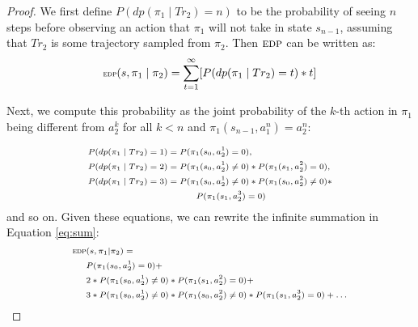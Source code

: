 \documentclass[letterpaper]{article}
\begin{document}
\begin{proof}
We first define $P(dp(\pi_1 \mid Tr_2)=n)$ to be the probability of seeing $n$ steps before observing an action that $\pi_1$ will not take in state $s_{n-1}$, assuming that $Tr_2$ is some trajectory sampled from $\pi_2$. Then $\textsc{edp}$ can be written as:%
\begin{equation}
\scriptsize
\label{eq:sum}
    \textsc{edp}(s, \pi_1 \mid \pi_2) = \sum\limits_{t=1}^\infty[P(dp(\pi_1 \mid Tr_2) = t)*t]
\normalsize
\end{equation}

Next, we compute this probability as the joint probability of the $k$-th action in $\pi_1$ being different from $a_2^k$ for all $k < n$ and $\pi_1(s_{n-1},a_1^n)=a_2^n$:

\begin{equation}
\label{eq:series}
\scriptsize
\begin{split}
    & P(dp(\pi_1 \mid Tr_2) = 1) = P(\pi_1(s_0, a_2^1) = 0), \\
    & P(dp(\pi_1 \mid Tr_2) = 2) = P(\pi_1(s_0, a_2^1) \neq 0)*P(\pi_1(s_1, a_2^2) = 0), \\
    & P(dp(\pi_1 \mid Tr_2) = 3) = P(\pi_1(s_0, a_2^1) \neq 0)*P(\pi_1(s_0, a_2^2) \neq 0) * \\ & \qquad \qquad \qquad \qquad \qquad ~~~~~~ P(\pi_1(s_1, a_2^3) = 0)
\end{split}
\normalsize
\end{equation}
and so on. Given these equations, we can rewrite the infinite summation in Equation \ref{eq:sum}:
\begin{equation*}
\scriptsize
\begin{split}
     \textsc{edp} & (s, \pi_1 | \pi_2) = \\
     & P(\pi_1(s_0, a_2^1) = 0) + \\
     & 2*P(\pi_1(s_0, a_2^1) \neq 0)*P(\pi_1(s_1, a_2^2) =0) + \\
     & 3*P(\pi_1(s_0, a_2^1) \neq 0)*P(\pi_1(s_0, a_2^2) \neq 0)*P(\pi_1(s_1, a_2^3) = 0) + \ldots
\end{split}
\normalsize
\end{equation*}


\end{proof}
\end{document}

